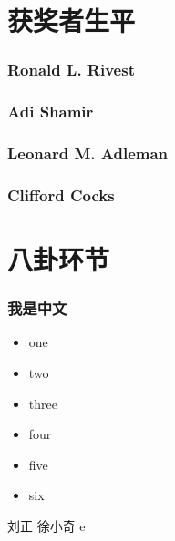 \documentclass[slidestop,compress,mathserif]{beamer}
\begin{document}
\section{获奖者生平}
\begin{frame}
  \frametitle{Ronald L. Rivest}

\end{frame}

\begin{frame}
  \frametitle{Adi Shamir}

\end{frame}

\begin{frame}
  \frametitle{Leonard M. Adleman}

\end{frame}

\begin{frame}
  \frametitle{Clifford Cocks}

\end{frame}




\section{八卦环节}









\begin{frame}
\frametitle{我是中文} 
\begin{itemize}[<+->]
\item one
\item two
\item three
\item four
\item five
\item six
\end{itemize}

刘正 徐小奇 e
\end{frame}
\end{document}
